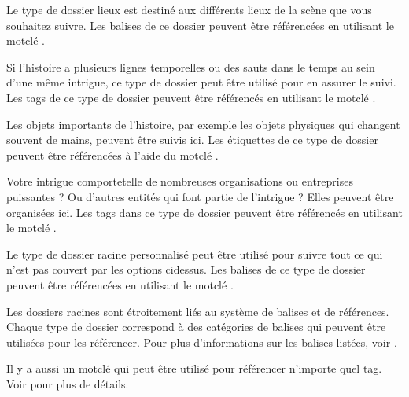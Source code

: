 \documentclass[a4paper,11pt,french]{sphinxmanual}
\begin{document}
\begin{description}
\sphinxAtStartPar
Le type de dossier lieux est destiné aux différents lieux de la scène que vous souhaitez suivre. Les balises de ce dossier peuvent être référencées en utilisant le mot\sphinxhyphen{}clé .

\sphinxAtStartPar
Si l’histoire a plusieurs lignes temporelles ou des sauts dans le temps au sein d’une même intrigue, ce type de dossier peut être utilisé pour en assurer le suivi. Les tags de ce type de dossier peuvent être référencés en utilisant le mot\sphinxhyphen{}clé .

\sphinxAtStartPar
Les objets importants de l’histoire, par exemple les objets physiques qui changent souvent de mains, peuvent être suivis ici. Les étiquettes de ce type de dossier peuvent être référencées à l’aide du mot\sphinxhyphen{}clé .

\sphinxAtStartPar
Votre intrigue comporte\sphinxhyphen{}t\sphinxhyphen{}elle de nombreuses organisations ou entreprises puissantes ? Ou d’autres entités qui font partie de l’intrigue ? Elles peuvent être organisées ici. Les tags dans ce type de dossier peuvent être référencés en utilisant le mot\sphinxhyphen{}clé .

\sphinxAtStartPar
Le type de dossier racine personnalisé peut être utilisé pour suivre tout ce qui n’est pas couvert par les options ci\sphinxhyphen{}dessus. Les balises de ce type de dossier peuvent être référencées en utilisant le mot\sphinxhyphen{}clé .

\end{description}

\sphinxAtStartPar
Les dossiers racines sont étroitement liés au système de balises et de références. Chaque type de dossier correspond à des catégories de balises qui peuvent être utilisées pour les référencer. Pour plus d’informations sur les balises listées, voir {\hyperref[\detokenize{project_references:a-references-references}]{}}.

\sphinxAtStartPar
Il y a aussi un mot\sphinxhyphen{}clé  qui peut être utilisé pour référencer n’importe quel tag. Voir {\hyperref[\detokenize{project_references:a-references-references}]{}} pour plus de détails.
\end{document}

